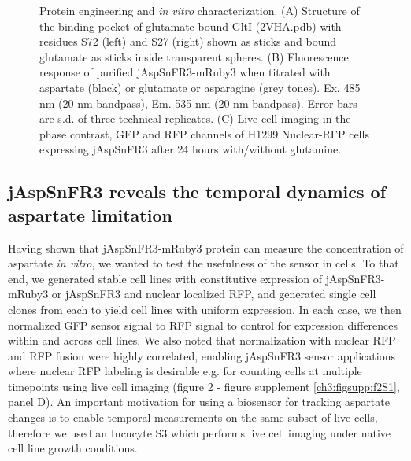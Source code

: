 \begin{figure}[ht!]
\centering
{}
\caption[Protein engineering and \textit{in vitro} characterization.]{
    Protein engineering and \textit{in vitro} characterization.
    (A) Structure of the binding pocket of glutamate-bound GltI (2VHA.pdb) with residues S72 (left) and S27 (right) shown as sticks and bound glutamate as sticks inside transparent spheres.
    (B) Fluorescence response of purified jAspSnFR3-mRuby3 when titrated with aspartate (black) or glutamate or asparagine (grey tones).
    Ex. 485 nm (20 nm bandpass), Em. 535 nm (20 nm bandpass).
    Error bars are s.d. of three technical replicates.
    (C) Live cell imaging in the phase contrast, GFP and RFP channels of H1299 Nuclear-RFP cells expressing jAspSnFR3 after 24 hours with/without glutamine.
}
\label{ch3:fig:Fig1}
\end{figure}







\subsection{jAspSnFR3 reveals the temporal dynamics of aspartate limitation}
Having shown that jAspSnFR3-mRuby3 protein can measure the concentration of aspartate \textit{in vitro}, we wanted to test the usefulness of the sensor in cells.
To that end, we generated stable cell lines with constitutive expression of jAspSnFR3-mRuby3 or jAspSnFR3 and nuclear localized RFP, and generated single cell clones from each to yield cell lines with uniform expression.
In each case, we then normalized GFP sensor signal to RFP signal to control for expression differences within and across cell lines.
We also noted that normalization with nuclear RFP and RFP fusion were highly correlated, enabling jAspSnFR3 sensor applications where nuclear RFP labeling is desirable e.g. for counting cells at multiple timepoints using live cell imaging (figure 2 - figure supplement \ref{ch3:figsupp:f2S1}, panel D).
An important motivation for using a biosensor for tracking aspartate changes is to enable temporal measurements on the same subset of live cells, therefore we used an Incucyte S3 which performs live cell imaging under native cell line growth conditions.

